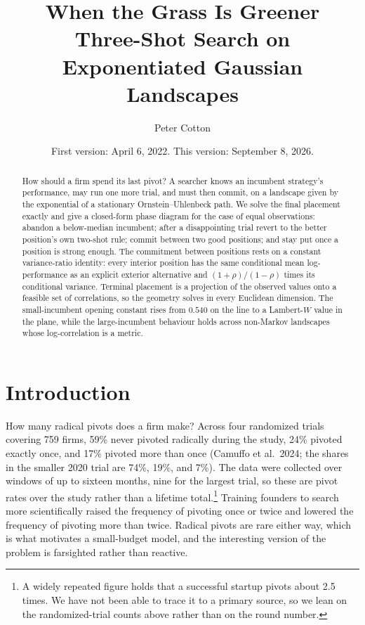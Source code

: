 \documentclass[11pt]{article}
\title{When the Grass Is Greener\\[4pt]
{\large Three-Shot Search on Exponentiated Gaussian Landscapes}}
\author{Peter Cotton}
\date{\normalsize First version: April 6, 2022. This version: September 8, 2026.}
\theoremstyle{itheads}
\begin{document}
\maketitle

\begin{abstract}
\noindent How should a firm spend its last pivot? A searcher knows an
incumbent strategy's performance, may run one more trial, and must
then commit, on a landscape given by the exponential of a stationary
Ornstein--Uhlenbeck path. We solve the final placement exactly and
give a closed-form phase diagram for the case of equal observations:
abandon a below-median incumbent; after a disappointing trial revert
to the better position's own two-shot rule; commit between two good
positions; and stay put once a position is strong enough. The commitment between positions
rests on a constant variance-ratio identity: every interior position has
the same conditional mean log-performance as an explicit exterior
alternative and $(1+\rho)/(1-\rho)$ times its conditional variance. Terminal placement is a projection of the observed values onto a
feasible set of correlations, so the geometry solves in every Euclidean
dimension. The small-incumbent opening constant rises from $0.540$ on
the line to a Lambert-$W$ value in the plane, while the large-incumbent
behaviour holds across non-Markov landscapes whose log-correlation is a
metric.
\end{abstract}

\section{Introduction}

How many radical pivots does a firm make? Across four randomized
trials covering 759 firms, 59\% never pivoted radically during the
study, 24\% pivoted exactly once, and 17\% pivoted more than once
(Camuffo et al.\ 2024; the shares in the smaller 2020 trial are
74\%, 19\%, and 7\%). The data were collected over windows of up to
sixteen months, nine for the largest trial, so these are pivot rates
over the study rather than a lifetime total.\footnote{A widely
repeated figure holds that a successful startup pivots about 2.5
times. We have not been able to trace it to a primary source, so we
lean on the randomized-trial counts above rather than on the round
number.} Training founders to search more scientifically raised the
frequency of pivoting once or twice and lowered the frequency of
pivoting more than twice. Radical pivots are rare either way, which is
what motivates a small-budget model, and the interesting version of
the problem is farsighted rather than reactive.
\end{document}
